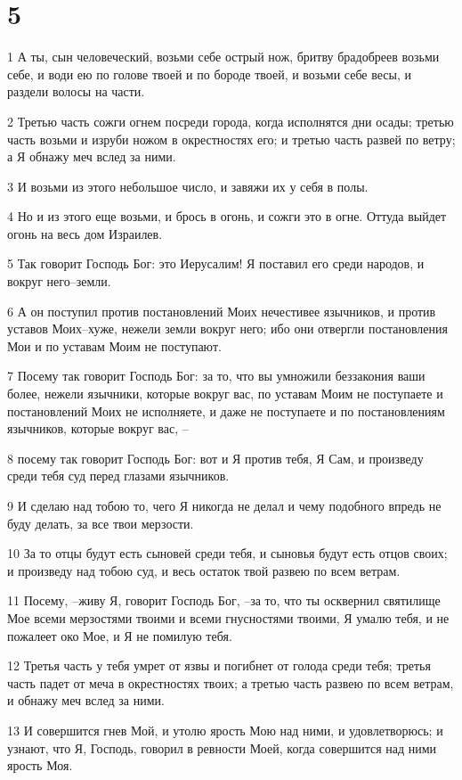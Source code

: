 \chapter{5}

\par 1 А ты, сын человеческий, возьми себе острый нож, бритву брадобреев возьми себе, и води ею по голове твоей и по бороде твоей, и возьми себе весы, и раздели волосы на части.
\par 2 Третью часть сожги огнем посреди города, когда исполнятся дни осады; третью часть возьми и изруби ножом в окрестностях его; и третью часть развей по ветру; а Я обнажу меч вслед за ними.
\par 3 И возьми из этого небольшое число, и завяжи их у себя в полы.
\par 4 Но и из этого еще возьми, и брось в огонь, и сожги это в огне. Оттуда выйдет огонь на весь дом Израилев.
\par 5 Так говорит Господь Бог: это Иерусалим! Я поставил его среди народов, и вокруг него--земли.
\par 6 А он поступил против постановлений Моих нечестивее язычников, и против уставов Моих--хуже, нежели земли вокруг него; ибо они отвергли постановления Мои и по уставам Моим не поступают.
\par 7 Посему так говорит Господь Бог: за то, что вы умножили беззакония ваши более, нежели язычники, которые вокруг вас, по уставам Моим не поступаете и постановлений Моих не исполняете, и даже не поступаете и по постановлениям язычников, которые вокруг вас, --
\par 8 посему так говорит Господь Бог: вот и Я против тебя, Я Сам, и произведу среди тебя суд перед глазами язычников.
\par 9 И сделаю над тобою то, чего Я никогда не делал и чему подобного впредь не буду делать, за все твои мерзости.
\par 10 За то отцы будут есть сыновей среди тебя, и сыновья будут есть отцов своих; и произведу над тобою суд, и весь остаток твой развею по всем ветрам.
\par 11 Посему, --живу Я, говорит Господь Бог, --за то, что ты осквернил святилище Мое всеми мерзостями твоими и всеми гнусностями твоими, Я умалю тебя, и не пожалеет око Мое, и Я не помилую тебя.
\par 12 Третья часть у тебя умрет от язвы и погибнет от голода среди тебя; третья часть падет от меча в окрестностях твоих; а третью часть развею по всем ветрам, и обнажу меч вслед за ними.
\par 13 И совершится гнев Мой, и утолю ярость Мою над ними, и удовлетворюсь; и узнают, что Я, Господь, говорил в ревности Моей, когда совершится над ними ярость Моя.
